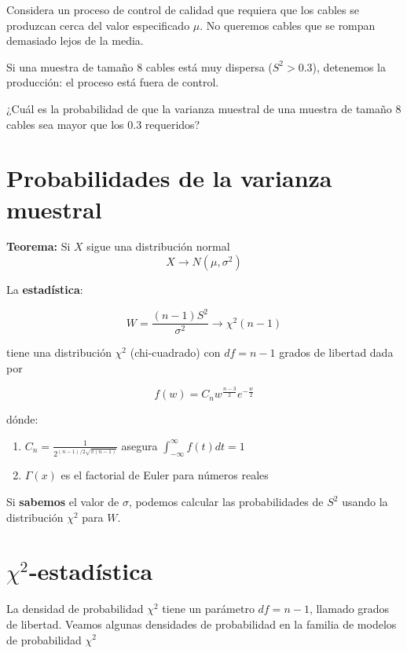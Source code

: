 \documentclass[
]{book}
\providecommand{\tightlist}{%
  \setlength{\itemsep}{0pt}\setlength{\parskip}{0pt}}
\begin{document}
Considera un proceso de control de calidad que requiera que los cables se produzcan cerca del valor especificado \(\mu\). No queremos cables que se rompan demasiado lejos de la media.

Si una muestra de tamaño \(8\) cables está muy dispersa (\(S^2>0.3\)), detenemos la producción: el proceso está fuera de control.

¿Cuál es la probabilidad de que la varianza muestral de una muestra de tamaño \(8\) cables sea mayor que los \(0.3\) requeridos?

\hypertarget{probabilidades-de-la-varianza-muestral}{%
\section{Probabilidades de la varianza muestral}\label{probabilidades-de-la-varianza-muestral}}

\textbf{Teorema:} Si \(X\) sigue una distribución normal
\[X \rightarrow N(\mu, \sigma^2)\]

La \textbf{estadística}:

\[W=\frac{(n-1)S^2}{\sigma^2} \rightarrow \chi^2(n-1)\]

tiene una distribución \(\chi^2\) (chi-cuadrado) con \(df=n-1\) grados de libertad dada por

\[f(w)=C_n w^{\frac{n-3}{2}} e^{-\frac{w}{2}}\]

dónde:

\begin{enumerate}
\def\labelenumi{\arabic{enumi})}
\tightlist
\item
  \(C_n=\frac{1}{2^{(n-1)/2\sqrt{\pi(n-1)}}}\) asegura \(\int_{-\infty}^{\infty} f (t)dt=1\)
\item
  \(\Gamma(x)\) es el factorial de Euler para números reales
\end{enumerate}

Si \textbf{sabemos} el valor de \(\sigma\), podemos calcular las probabilidades de \(S^2\) usando la distribución \(\chi^2\) para \(W\).

\hypertarget{chi2-estaduxedstica}{%
\section{\texorpdfstring{\(\chi^2\)-estadística}{\textbackslash chi\^{}2-estadística}}\label{chi2-estaduxedstica}}

La densidad de probabilidad \(\chi^2\) tiene un parámetro \(df=n-1\), llamado grados de libertad. Veamos algunas densidades de probabilidad en la familia de modelos de probabilidad \(\chi^2\)
\end{document}
